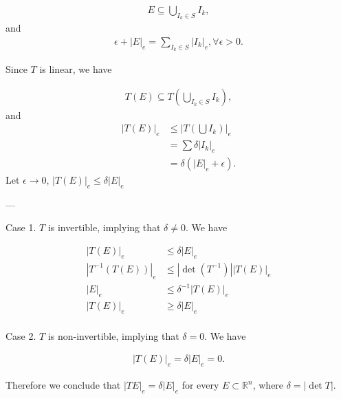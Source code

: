 \documentclass[UTF8,a4paper,10pt]{article}
\begin{document}
\begin{solution}
    \begin{equation*}
      \begin{aligned}
        E \subseteq \bigcup_{I_k\in S} I_k,
      \end{aligned}
    \end{equation*}
and 
\begin{equation*}
  \begin{aligned}
    \epsilon +|E|_e = \sum_{I_k\in S} |I_k|_e, \forall \epsilon>0.
  \end{aligned}
\end{equation*}

Since \(T\) is linear, we have

\begin{equation*}
  \begin{aligned}
    T(E)\subseteq T(\bigcup_{I_k\in S} I_k),
  \end{aligned}
\end{equation*}
and
\begin{equation*}
  \begin{aligned}
    |T(E)|_e
    &\leq |T(\bigcup I_k)|_e\\
    &= \sum \delta |I_k|_e\\
    &= \delta (|E|_e+\epsilon).
  \end{aligned}
\end{equation*}
Let \(\epsilon\to 0\), \(|T(E)|_e\leq\delta|E|_e\)

---

Case 1. \(T\) is invertible, implying that \(\delta\neq0\). We have

\begin{equation*}
  \begin{aligned}
    |T(E)|_e    &\leq \delta |E|_e\\
    |T^{-1}(T(E))|_e    &\leq |\det(T^{-1})| |T(E)|_e\\
    |E|_e    &\leq \delta^{-1} |T(E)|_e\\
    |T(E)|_e    &\geq \delta |E|_e\\
  \end{aligned}
\end{equation*}

Case 2. \(T\) is non-invertible, implying that \(\delta=0\). We have

\begin{equation*}
  \begin{aligned}
    |T(E)|_e    = \delta |E|_e = 0.
  \end{aligned}
\end{equation*}

Therefore we conclude that \(|TE|_e = \delta|E|_e\) for every \(E \subset \mathbb{R}^n\), where \(\delta  = |\det T|\).


  \end{solution}
\end{document}
